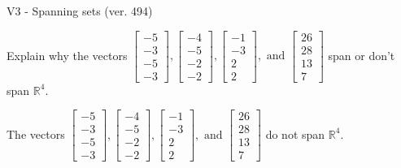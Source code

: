 \begin{exercise}
  \begin{exerciseTitle}V3 - Spanning sets (ver. 494)\end{exerciseTitle}
  \begin{exerciseStatement}
    Explain why the vectors \(\left[\begin{array}{r}
-5 \\
-3 \\
-5 \\
-3
\end{array}\right] , \left[\begin{array}{r}
-4 \\
-5 \\
-2 \\
-2
\end{array}\right] , \left[\begin{array}{r}
-1 \\
-3 \\
2 \\
2
\end{array}\right] , \text{ and } \left[\begin{array}{r}
26 \\
28 \\
13 \\
7
\end{array}\right]\) span or don't span \(\mathbb{R}^4\). 
	


  \end{exerciseStatement}
  \begin{exerciseAnswer}
   The vectors \(\left[\begin{array}{r}
-5 \\
-3 \\
-5 \\
-3
\end{array}\right] , \left[\begin{array}{r}
-4 \\
-5 \\
-2 \\
-2
\end{array}\right] , \left[\begin{array}{r}
-1 \\
-3 \\
2 \\
2
\end{array}\right] , \text{ and } \left[\begin{array}{r}
26 \\
28 \\
13 \\
7
\end{array}\right]\) 
  	 do not  
	span \(\mathbb{R}^4\).
  


  \end{exerciseAnswer}
\end{exercise}